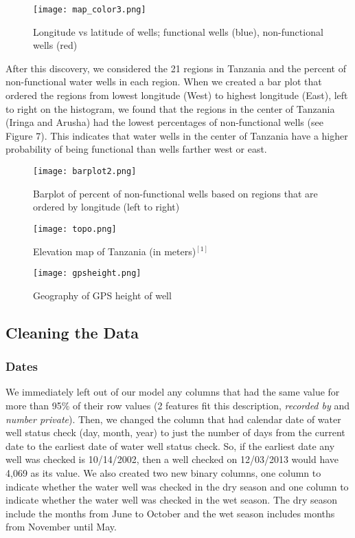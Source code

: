 \documentclass[10pt]{SelfArx} %
\begin{document}
\begin{figure}[ht]\centering
\captionsetup{skip=0.5cm}
\texttt{[image: map\_color3.png]}
\caption{Longitude vs latitude of wells; functional wells (blue), non-functional wells (red)}
\label{fig:map2}
\end{figure}

After this discovery, we considered the 21 regions in Tanzania and the percent of non-functional water wells in each region. When we created a bar plot that ordered the regions from lowest longitude (West) to highest longitude (East), left to right on the histogram, we found that the regions in the center of Tanzania (Iringa and Arusha) had the lowest percentages of non-functional wells (see Figure 7). This indicates that water wells in the center of Tanzania have a higher probability of being functional than wells farther west or east.

\begin{figure}[ht]\centering
\captionsetup{skip=0.5cm}
\texttt{[image: barplot2.png]}
\caption{Barplot of percent of non-functional wells based on regions that are ordered by longitude (left to right)}
\label{fig:barplot}
\end{figure}

\begin{figure*}
\centering
\begin{minipage}[b]{.4\textwidth}
\captionsetup{skip=0.5cm}
\texttt{[image: topo.png]}
\caption{Elevation map of Tanzania (in meters)$^{[1]}$}\label{label-a}
\end{minipage}\qquad \qquad \qquad
\begin{minipage}[b]{.4\textwidth}
\captionsetup{skip=0.5cm}
\texttt{[image: gpsheight.png]}
\caption{Geography of GPS height of well}\label{label-b}
\end{minipage}
\end{figure*}

\subsection{Cleaning the Data}

\subsubsection{Dates}

We immediately left out of our model any columns that had the same value for more than 95\% of their row values (2 features fit this description, \textit{recorded by} and \textit{number private}). Then, we changed the column that had calendar date of water well status check (day, month, year) to just the number of days from the current date to the earliest date of water well status check. So, if the earliest date any well was checked is 10/14/2002, then a well checked on 12/03/2013 would have 4,069 as its value. We also created two new binary columns, one column to indicate whether the water well was checked in the dry season and one column to indicate whether the water well was checked in the wet season. The dry season include the months from June to October and the wet season includes months from November until May.
\break
\end{document}
